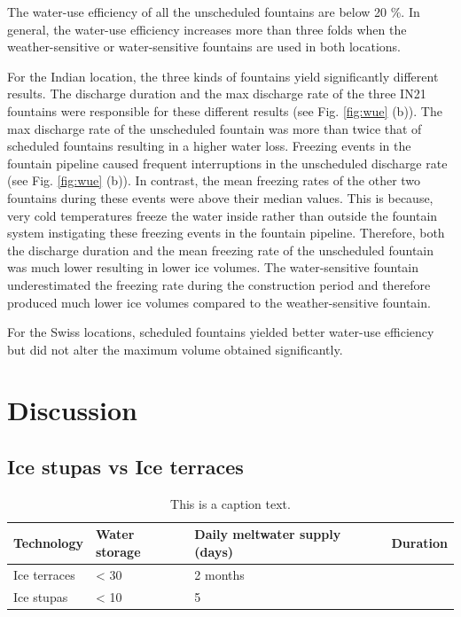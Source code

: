 The water-use efficiency of all the unscheduled fountains are below 20 \%. In general, the water-use efficiency
increases more than three folds when the weather-sensitive or water-sensitive fountains are used in both
locations.  

For the Indian location, the three kinds of fountains yield significantly different results.  The discharge
duration and the max discharge rate of the three IN21 fountains were responsible for these different results
(see Fig. \ref{fig:wue} (b)). The max discharge rate of the unscheduled fountain was more than twice that of
scheduled fountains resulting in a higher water loss. Freezing events in the fountain pipeline caused frequent
interruptions in the unscheduled discharge rate (see Fig. \ref{fig:wue} (b)). In contrast, the mean freezing
rates of the other two fountains during these events were above their median values. This is because, very cold
temperatures freeze the water inside rather than outside the fountain system instigating these freezing events in
the fountain pipeline. Therefore, both the discharge duration and the mean freezing rate of the unscheduled
fountain was much lower resulting in lower ice volumes. The water-sensitive fountain underestimated the freezing
rate during the construction period and therefore produced much lower ice volumes compared to the
weather-sensitive fountain. 

For the Swiss locations, scheduled fountains yielded better water-use efficiency but did not alter the maximum
volume obtained significantly. 


\section{Discussion}
\subsection{Ice stupas vs Ice terraces}

\begin{table}[htb]
	\begin{tabularx}{\textwidth}{X | X | X | X}
		\hline
    \textbf{Technology}& \textbf{Water storage}& \textbf{Daily meltwater supply (days)}& \textbf{Duration} \\
    \hline
		Ice terraces			& < 30				     & 2 months				\\
    Ice stupas        & < 10             & 5				\\
		\hline
	\end{tabularx}
	\label{tab:table1}
	\caption{This is a caption text.}
\end{table}

